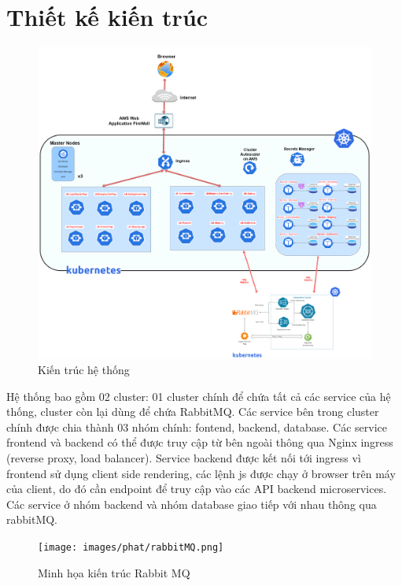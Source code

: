 \section{Thiết kế kiến trúc}
 \begin{figure}[H]
    \begin{center}
    \includegraphics[scale = 0.13]{images/phat/Release-architecture-v2}
    \vspace*{7mm}
    \caption{Kiến trúc hệ thống}
    \end{center}
    \label{}
\end{figure}
\noindent Hệ thống bao gồm 02 cluster: 01 cluster chính để chứa tất cả các service của hệ thống, cluster còn lại dùng để chứa RabbitMQ. Các service bên trong cluster chính được chia thành 03 nhóm chính: fontend, backend, database. Các service frontend và backend có thể được truy cập từ bên ngoài thông qua Nginx ingress (reverse proxy, load balancer). Service backend được kết nối tới ingress vì frontend sử dụng client side rendering, các lệnh js được chạy ở browser trên máy của client, do đó cần endpoint để truy cập vào các API backend microservices. Các service ở nhóm backend và nhóm database giao tiếp với nhau thông qua rabbitMQ.
\begin{figure}[H]
    \begin{center}
    \texttt{[image: images/phat/rabbitMQ.png]}
    \vspace*{7mm}
    \caption{Minh họa kiến trúc Rabbit MQ}
    \end{center}
    \label{}
\end{figure}
